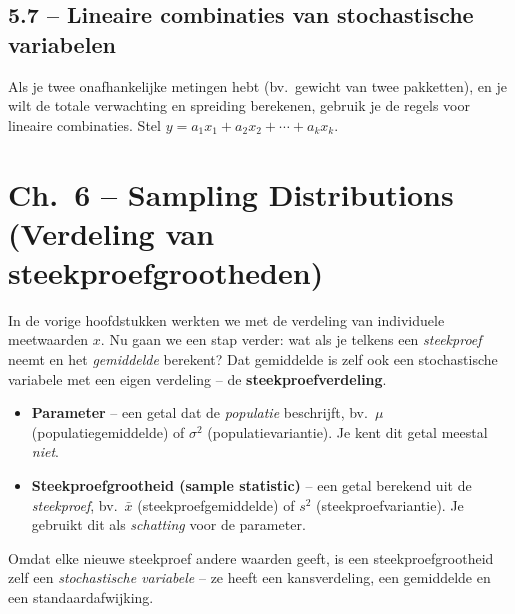 \documentclass[a4paper,11pt]{article}
\begin{document}
\subsection{5.7 -- Lineaire combinaties van stochastische variabelen}

\begin{conceptbox}
Als je twee onafhankelijke metingen hebt (bv.\ gewicht van twee pakketten), en je wilt de totale verwachting en spreiding berekenen, gebruik je de regels voor lineaire combinaties.
Stel $y = a_1 x_1 + a_2 x_2 + \cdots + a_k x_k$.
\end{conceptbox}



\newpage
\section{Ch.\ 6 -- Sampling Distributions (Verdeling van steekproefgrootheden)}

In de vorige hoofdstukken werkten we met de verdeling van individuele meetwaarden $x$. Nu gaan we een stap verder: wat als je telkens een \emph{steekproef} neemt en het \emph{gemiddelde} berekent? Dat gemiddelde is zelf ook een stochastische variabele met een eigen verdeling -- de \textbf{steekproefverdeling}.

\begin{conceptbox}
\begin{itemize}
  \item \textbf{Parameter} -- een getal dat de \emph{populatie} beschrijft, bv.\ $\mu$ (populatiegemiddelde) of $\sigma^2$ (populatievariantie). Je kent dit getal meestal \emph{niet}.
  \item \textbf{Steekproefgrootheid (sample statistic)} -- een getal berekend uit de \emph{steekproef}, bv.\ $\bar{x}$ (steekproefgemiddelde) of $s^2$ (steekproefvariantie). Je gebruikt dit als \emph{schatting} voor de parameter.
\end{itemize}
Omdat elke nieuwe steekproef andere waarden geeft, is een steekproefgrootheid zelf een \emph{stochastische variabele} -- ze heeft een kansverdeling, een gemiddelde en een standaardafwijking.
\end{conceptbox}
\end{document}

